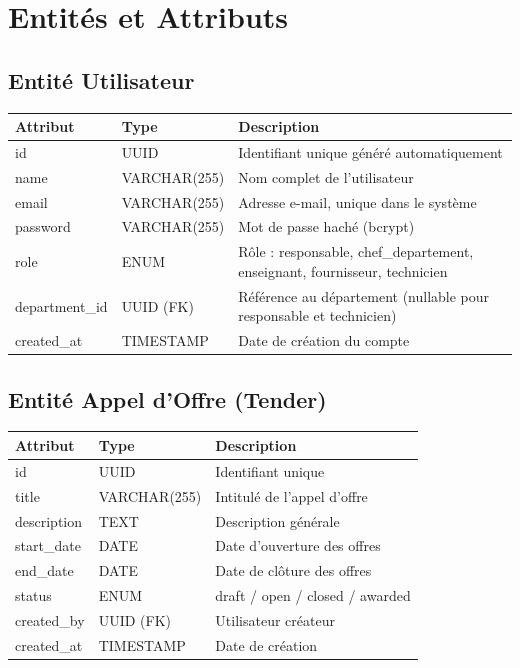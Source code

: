 \documentclass[12pt,a4paper]{report}
\begin{document}
\section{Entités et Attributs}

\subsection{Entité Utilisateur}

\begin{tabularx}{\textwidth}{|L{3cm}|L{3cm}|L{7cm}|}
\hline
{}\textbf{Attribut} & \textbf{Type} & \textbf{Description} \\
\hline
id & UUID & Identifiant unique généré automatiquement \\
\hline
name & VARCHAR(255) & Nom complet de l'utilisateur \\
\hline
email & VARCHAR(255) & Adresse e-mail, unique dans le système \\
\hline
password & VARCHAR(255) & Mot de passe haché (bcrypt) \\
\hline
role & ENUM & Rôle : responsable, chef\_departement, enseignant, fournisseur, technicien \\
\hline
department\_id & UUID (FK) & Référence au département (nullable pour responsable et technicien) \\
\hline
created\_at & TIMESTAMP & Date de création du compte \\
\hline
\end{tabularx}

\subsection{Entité Appel d'Offre (Tender)}

\begin{tabularx}{\textwidth}{|L{3cm}|L{3cm}|L{7cm}|}
\hline
{}\textbf{Attribut} & \textbf{Type} & \textbf{Description} \\
\hline
id & UUID & Identifiant unique \\
\hline
title & VARCHAR(255) & Intitulé de l'appel d'offre \\
\hline
description & TEXT & Description générale \\
\hline
start\_date & DATE & Date d'ouverture des offres \\
\hline
end\_date & DATE & Date de clôture des offres \\
\hline
status & ENUM & draft / open / closed / awarded \\
\hline
created\_by & UUID (FK) & Utilisateur créateur \\
\hline
created\_at & TIMESTAMP & Date de création \\
\hline
\end{tabularx}
\end{document}
